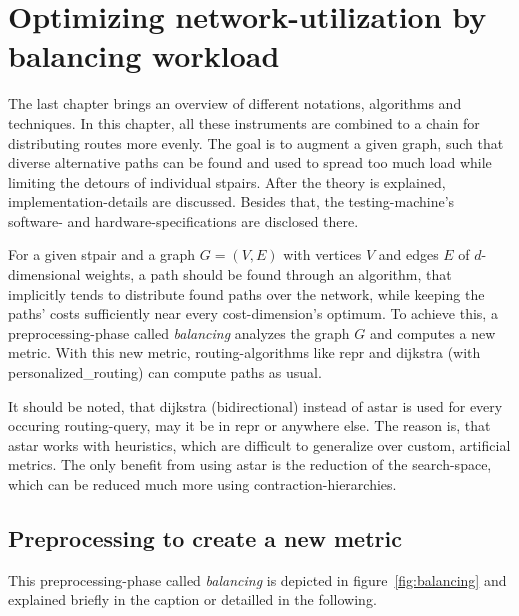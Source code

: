 \chapter{Optimizing network-utilization by balancing workload}
\label{chap:balancing}

The last chapter brings an overview of different notations, algorithms and techniques.
In this chapter, all these instruments are combined to a chain for distributing routes more evenly.
The goal is to augment a given graph, such that diverse alternative paths can be found and used to spread too much load while limiting the detours of individual \glspl{stpair}.
After the theory is explained, implementation-details are discussed.
Besides that, the testing-machine's software- and hardware-specifications are disclosed there.

For a given \gls{stpair} and a graph $G = (V, E)$ with vertices $V$ and edges $E$ of $d$-dimensional \glspl{weight}, a path should be found through an algorithm, that implicitly tends to distribute found paths over the network, while keeping the paths' \glspl{cost} sufficiently near every \gls{cost}-dimension's optimum.
To achieve this, a preprocessing-phase called \textit{balancing} analyzes the graph $G$ and computes a new \gls{metric}.
With this new \gls{metric}, routing-algorithms like \gls{repr} and \gls{dijkstra} (with \gls{personalized_routing}) can compute paths as usual.

It should be noted, that \gls{dijkstra} (bidirectional) instead of \gls{astar} is used for every occuring routing-query, may it be in \gls{repr} or anywhere else.
The reason is, that \gls{astar} works with heuristics, which are difficult to generalize over custom, artificial \glspl{metric}.
The only benefit from using \gls{astar} is the reduction of the search-space, which can be reduced much more using \gls{contraction-hierarchies}.

\section{Preprocessing to create a new metric}


    This preprocessing-phase called \textit{balancing} is depicted in figure~\ref{fig:balancing} and explained briefly in the caption or detailled in the following.

